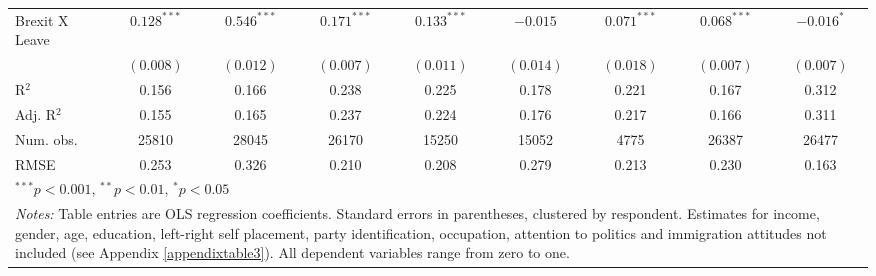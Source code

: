 \documentclass[12pt, letter]{article}
\begin{document}
\begin{table}
\begin{center}
{\begin{tabular}{l c c c c c c c c }
Brexit X Leave                   & $0.128^{***}$  & $0.546^{***}$  & $0.171^{***}$  & $0.133^{***}$  & $-0.015$       & $0.071^{***}$  & $0.068^{***}$  & $-0.016^{*}$   \\
                                 & $(0.008)$      & $(0.012)$      & $(0.007)$      & $(0.011)$      & $(0.014)$      & $(0.018)$      & $(0.007)$      & $(0.007)$      \\
\hline
R$^2$                            & 0.156          & 0.166          & 0.238          & 0.225          & 0.178          & 0.221          & 0.167          & 0.312          \\
Adj. R$^2$                       & 0.155          & 0.165          & 0.237          & 0.224          & 0.176          & 0.217          & 0.166          & 0.311          \\
Num. obs.                        & 25810          & 28045          & 26170          & 15250          & 15052          & 4775           & 26387          & 26477          \\
RMSE                             & 0.253          & 0.326          & 0.210          & 0.208          & 0.279          & 0.213          & 0.230          & 0.163          \\
\hline
\multicolumn{9}{l}{\scriptsize{$^{***}p<0.001$, $^{**}p<0.01$, $^*p<0.05$}} \\
\multicolumn{9}{l}{\multirow{3}{650pt}{\footnotesize{\textit{Notes:} Table entries are OLS regression coefficients. Standard errors in parentheses, clustered by respondent. Estimates for income, gender, age, education, left-right self placement, party identification, occupation, attention to politics and immigration attitudes not included (see Appendix \ref{appendixtable3}). All dependent variables range from zero to one.}}} \\
\end{tabular}}
\label{table:10month}
\end{center}
\end{table}
\end{document}
